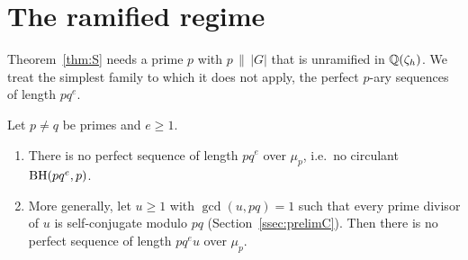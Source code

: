 \section{The ramified regime}\label{sec:ramified}

Theorem~\ref{thm:S} needs a prime $p$ with $p\,\|\,|G|$ that is
unramified in $\mathbb{Q}(\zeta_h)$. We treat the simplest family to which it
does not apply, the perfect $p$-ary sequences of length $pq^e$.

\begin{theorem}\label{thm:C}
Let $p\ne q$ be primes and $e\ge1$.
\begin{enumerate}[label=\textup{(\roman*)}]
\item There is no perfect sequence of length $pq^e$ over $\mu_p$, i.e.\
no circulant $\operatorname{BH}(pq^e,p)$. 
\item More generally, let $u\ge1$ with $\gcd(u,pq)=1$ such that every
prime divisor of $u$ is self-conjugate modulo $pq$
(Section~\ref{ssec:prelimC}). Then there is no
perfect sequence of length $pq^eu$ over $\mu_p$.
\end{enumerate}
\end{theorem}

